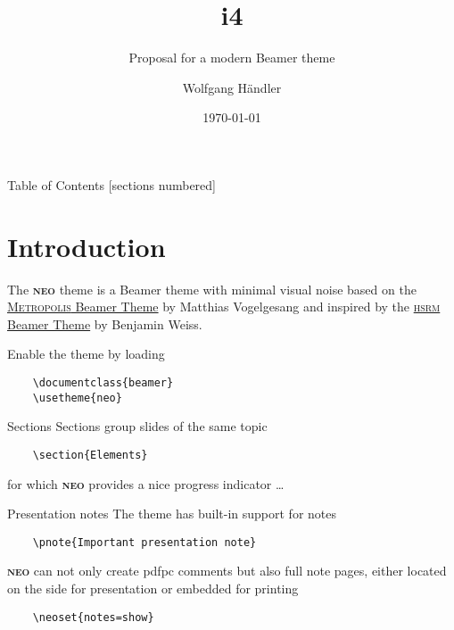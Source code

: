 \documentclass[10pt]{beamer}
\title[i4\themename Theme Demo]{i4\themename}
\subtitle{Proposal for a modern Beamer theme}
\date{\today}
\author{Wolfgang Händler}
\institute{Friedrich-Alexander-Universität Erlangen-Nürnberg}
\newcommand{\themename}{\textbf{\textsc{neo}}\xspace}
\begin{document}
\maketitle[intern]

\begin{frame}{Table of Contents}
  [sections numbered]
  \tableofcontents[hideallsubsections]
\end{frame}

\section{Introduction}

\begin{frame}[fragile]
  The \themename theme is a Beamer theme with minimal visual noise
  based on the \href{https://github.com/matze/mtheme}{\textsc{Metropolis} Beamer Theme} by Matthias Vogelgesang and inspired by the \href{https://github.com/hsrmbeamertheme/hsrmbeamertheme}{\textsc{hsrm} Beamer Theme} by Benjamin Weiss.

  Enable the theme by loading

  \begin{verbatim}    \documentclass{beamer}
    \usetheme{neo}\end{verbatim}

\end{frame}
\begin{frame}[fragile]{Sections}
  Sections group slides of the same topic

  \begin{verbatim}    \section{Elements}\end{verbatim}

  for which \themename provides a nice progress indicator \ldots
\end{frame}

\begin{frame}[fragile]{Presentation notes}
  The theme has built-in support for notes

  \begin{verbatim}    \pnote{Important presentation note}\end{verbatim}

  \themename can not only create pdfpc comments but also full note pages, either located on the side for presentation or embedded for printing
  \begin{verbatim}    \neoset{notes=show}\end{verbatim}
\end{frame}
\end{document}
